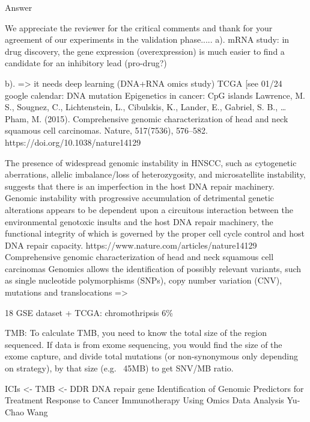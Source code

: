 \documentclass[preprint,12pt]{elsarticle}
\newenvironment{MyColorPar}[1]{%
    \leavevmode\color{#1}\ignorespaces%
}{%
}%
\begin{document}
\begin{MyColorPar}{blue}
Answer

We appreciate the reviewer for the critical comments and thank for your agreement of our experiments in the validation phase.....
a). mRNA study: in drug discovery, the gene expression (overexpression) is much easier to find a candidate for an inhibitory lead (pro-drug?) %

b). => it needs deep learning (DNA+RNA omics study)
\cite{Lawrence2015a} TCGA %
[see 01/24 google calendar: DNA mutation
Epigenetics in cancer: CpG islands
Lawrence, M. S., Sougnez, C., Lichtenstein, L., Cibulskis, K., Lander, E., Gabriel, S. B., … Pham, M. (2015). Comprehensive genomic characterization of head and neck squamous cell carcinomas. Nature, 517(7536), 576–582. https://doi.org/10.1038/nature14129

The presence of widespread genomic instability in HNSCC, such as cytogenetic aberrations, allelic imbalance/loss of heterozygosity, and microsatellite instability, suggests that there is an imperfection in the host DNA repair machinery. Genomic instability with progressive accumulation of detrimental genetic alterations appears to be dependent upon a circuitous interaction between the environmental genotoxic insults and the host DNA repair machinery, the functional integrity of which is governed by the proper cell cycle control and host DNA repair capacity.
https://www.nature.com/articles/nature14129 Comprehensive genomic characterization of head and neck squamous cell carcinomas
Genomics allows the identification of possibly relevant variants, such as single nucleotide polymorphisms (SNPs), copy number variation (CNV), mutations and translocations => %

18 GSE dataset + TCGA: chromothripsis 6\%

TMB: To calculate TMB, you need to know the total size of the region sequenced. If data is from exome sequencing, you would find the size of the exome capture, and divide total mutations (or non-synonymous only depending on strategy), by that size (e.g. ~45MB) to get SNV/MB ratio.

ICIs <- TMB <- DDR DNA repair gene
Identification of Genomic Predictors for Treatment Response to Cancer Immunotherapy Using Omics Data Analysis
Yu-Chao Wang


\end{MyColorPar}
\end{document}
